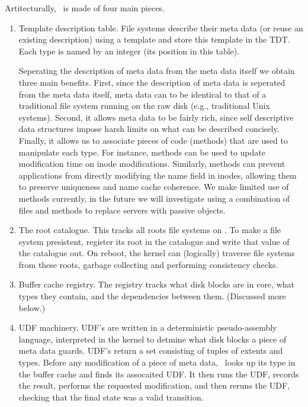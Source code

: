 Artitecturally, \xxx\ is made of four main pieces.
\begin{enumerate}
	\item Template description table.  File systems describe their
	meta data (or reuse an existing description) using a template
	and store this template in the TDT.  Each type is named by an
	integer (its position in this table).

	Seperating the description of meta data from the meta data
	itself we obtain three main benefits.  First, since the
	description of meta data is seperated from the meta data
	itself, meta data can to be identical to that of a traditional
	file system running on the raw disk (e.g., traditional Unix
	systems).  Second, it allows meta data to be fairly rich, since
	self descriptive data structures impose harsh limits on what
	can be described concisely.  Finally, it allows us to associate
	pieces of code (methods) that are used to manipulate each
	type.  For instance, methods can be used to update modification
	time on inode modifications.  Similarly, methods can prevent
	applications from directly modifying the name field in inodes,
	allowing them to preserve uniqueness and name cache coherence.
	We make limited use of methods currently, in the future we will
	investigate using a combination of files and methods to replace
	servers with passive objects.

	\item  The root catalogue.  This tracks all roots file systems
	on \xxx .  To make a file system presistent, register its root
	in the catalogue and write that value of the catalogue out.  On
	reboot, the kernel can (logically) traverse file systems from
	these roots, garbage collecting and performing consistency
	checks.

	\item Buffer cache registry.    The registry tracks what disk
	blocks are in core, what types they contain, and the
	dependencies between them.  (Discussed more below.)

	\item UDF machinery.  UDF's are written in a deterministic
	pseudo-assembly language, interpreted in the kernel to detmine
	what disk blocks a piece of meta data guards.  UDF's return a
	set consisting of tuples of extents and types.  Before any
	modification of a piece of meta data, \xxx\ looks up its type
	in the buffer cache and finds its assocaited UDF.  It then runs
	the UDF, records the result, performs the requested
	modification, and then reruns the UDF, checking that the final
	state was a valid transition.

\end{enumerate}

